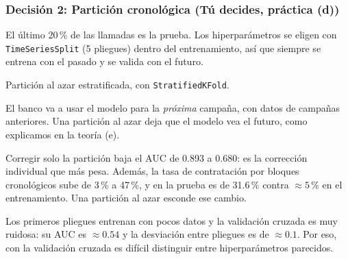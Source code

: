 \documentclass[11pt, letterpaper]{article}
\begin{document}
\subsubsection*{Decisión 2: Partición cronológica (Tú decides, práctica (d))}
\begin{description}[leftmargin=0pt, itemsep=2pt]
    \item[Decisión.] El último 20\,\% de las llamadas es la prueba. Los hiperparámetros se eligen con \texttt{TimeSeriesSplit} (5 pliegues) dentro del entrenamiento, así que siempre se entrena con el pasado y se valida con el futuro.
    \item[Alternativa descartada.] Partición al azar estratificada, con \texttt{StratifiedKFold}.
    \item[Por qué.] El banco va a usar el modelo para la \emph{próxima} campaña, con datos de campañas anteriores. Una partición al azar deja que el modelo vea el futuro, como explicamos en la teoría (e).
    \item[Evidencia.] Corregir solo la partición baja el AUC de 0.893 a 0.680: es la corrección individual que más pesa. Además, la tasa de contratación por bloques cronológicos sube de 3\,\% a 47\,\%, y en la prueba es de 31.6\,\% contra $\approx 5$\,\% en el entrenamiento. Una partición al azar esconde ese cambio.
    \item[Qué perdemos.] Los primeros pliegues entrenan con pocos datos y la validación cruzada es muy ruidosa: su AUC es $\approx 0.54$ y la desviación entre pliegues es de $\approx 0.1$. Por eso, con la validación cruzada es difícil distinguir entre hiperparámetros parecidos.
\end{description}
\end{document}

